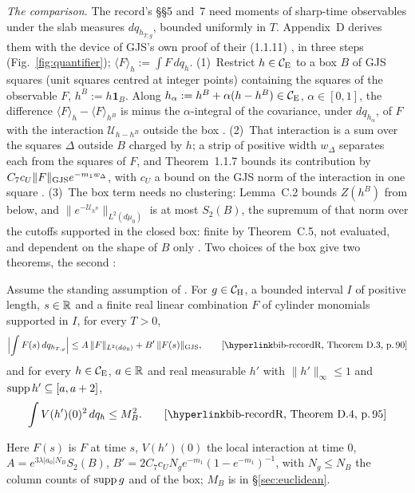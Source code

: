 \emph{The comparison.} The record's \S\S5 and~7 need moments of sharp-time observables
under the slab measures $dq_{h_{T,g}}$, bounded uniformly in $T$. Appendix~D derives them
with the device of GJS's own proof of their (1.1.11) , in three steps
(Fig.~\ref{fig:quantifier}); $\langle F\rangle_h:=\int F\,dq_h$.
(1)~Restrict $h\in\mathcal{C}_{\mathrm E}$ to a box $B$ of GJS squares (unit squares centred at integer
points) containing the squares of the observable $F$, $h^B:=h\mathbf 1_B$. Along
$h_\alpha:=h^B+\alpha(h-h^B)\in\mathcal{C}_{\mathrm E}$, $\alpha\in[0,1]$, the difference
$\langle F\rangle_h-\langle F\rangle_{h^B}$ is minus the $\alpha$-integral of the
covariance, under $dq_{h_\alpha}$, of $F$ with the interaction $\mathcal U_{h-h^B}$ outside
the box .
(2)~That interaction is a sum over the squares $\Delta$ outside $B$ charged by $h$; a strip
of positive width $w_\Delta$ separates each from the squares of $F$, and Theorem~1.1.7 bounds its
contribution by $C_7c_U\|F\|_{\rm GJS}e^{-m_1w_\Delta}$, with $c_U$ a bound on the GJS norm
of the interaction in one square .
(3)~The box term needs no clustering: Lemma~C.2 bounds $Z(h^B)$ from below, and
$\|e^{-\mathcal U_{h^B}}\|_{L^2(d\mu_0)}$ is at most $S_2(B)$, the supremum of that norm over
the cutoffs supported in the closed box: finite by Theorem~C.5, not evaluated, and
dependent on the shape of $B$ only . Two choices of the box give
two theorems, the second :
\begin{checkpoint}
Assume the standing assumption of . For $g\in\mathcal{C}_{\mathrm H}$, a bounded interval $I$ of positive length, $s\in\mathbb{R}$ and a finite real
linear combination $F$ of cylinder monomials supported in $I$, for every $T>0$,
\begin{equation*}
 \Bigl|\int F(s)\,dq_{h_{T,g}}\Bigr|\le A\,\|F\|_{L^2(d\phi_0)}+B'\,\|F(s)\|_{\rm GJS} ,
 \tag*{\rec{Theorem~D.3}{90}}
\end{equation*}
and for every $h\in\mathcal{C}_{\mathrm E}$, $a\in\mathbb{R}$ and real measurable $h'$ with $\|h'\|_\infty\le1$ and
$\operatorname{supp} h'\subseteq[a,a+2]$,
\begin{equation*}
 \int V(h')(0)^2\,dq_h\le M_B^2 .
 \tag*{\rec{Theorem~D.4}{95}}
\end{equation*}
\end{checkpoint}
Here $F(s)$ is $F$ at time $s$, $V(h')(0)$ the local interaction at time $0$,
$A=e^{3\lambda|a_0|N_B}S_2(B)$, $B'=2C_7c_UN_ge^{-m_1}(1-e^{-m_1})^{-1}$, with $N_g\le N_B$
the column counts of $\operatorname{supp} g$ and of the box; $M_B$ is in \S\ref{sec:euclidean}.

